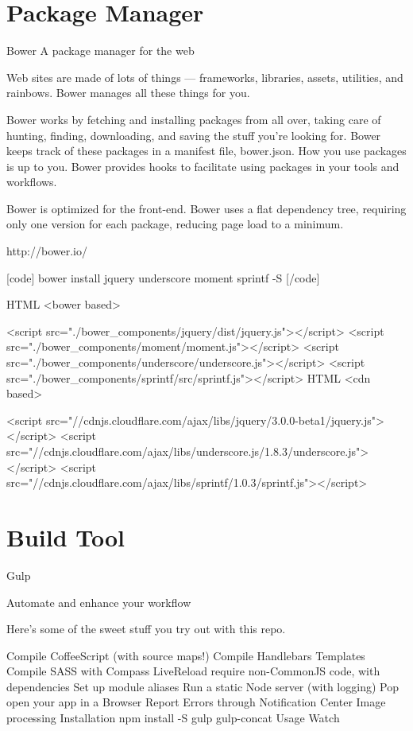 \section{Package Manager}

Bower
A package manager for the web

Web sites are made of lots of things — frameworks, libraries, assets, utilities, and rainbows. Bower manages all these things for you.

Bower works by fetching and installing packages from all over, taking care of hunting, finding, downloading, and saving the stuff you’re looking for. Bower keeps track of these packages in a manifest file, bower.json. How you use packages is up to you. Bower provides hooks to facilitate using packages in your tools and workflows.

Bower is optimized for the front-end. Bower uses a flat dependency tree, requiring only one version for each package, reducing page load to a minimum.

http://bower.io/

[code] bower install jquery underscore moment sprintf -S [/code]

HTML <bower based>

<script src="./bower_components/jquery/dist/jquery.js"></script>
<script src="./bower_components/moment/moment.js"></script>
<script src="./bower_components/underscore/underscore.js"></script>
<script src="./bower_components/sprintf/src/sprintf.js"></script>
HTML <cdn based>

<script src="//cdnjs.cloudflare.com/ajax/libs/jquery/3.0.0-beta1/jquery.js"></script>
<script src="//cdnjs.cloudflare.com/ajax/libs/underscore.js/1.8.3/underscore.js"></script>
<script src="//cdnjs.cloudflare.com/ajax/libs/sprintf/1.0.3/sprintf.js"></script>

\section{Build Tool}

Gulp

Automate and enhance your workflow

Here's some of the sweet stuff you try out with this repo.

Compile CoffeeScript (with source maps!)
Compile Handlebars Templates
Compile SASS with Compass
LiveReload
require non-CommonJS code, with dependencies
Set up module aliases
Run a static Node server (with logging)
Pop open your app in a Browser
Report Errors through Notification Center
Image processing
Installation
npm install -S gulp gulp-concat
Usage
Watch

